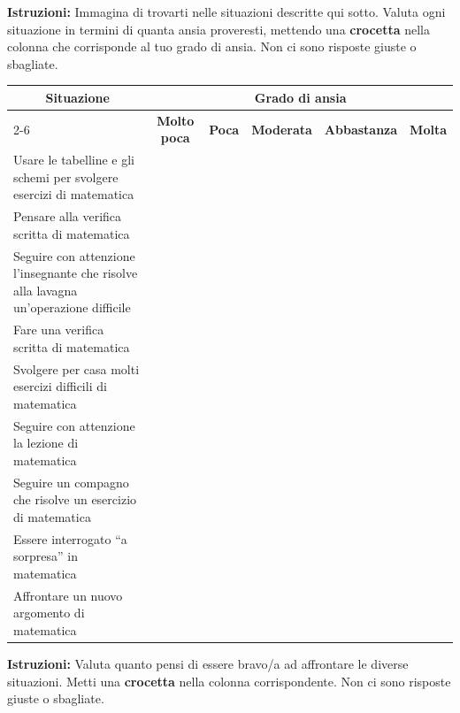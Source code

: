 \documentclass[11pt]{article}
\begin{document}
\vspace{0.3cm}

\noindent\textbf{Istruzioni:} Immagina di trovarti nelle situazioni descritte qui sotto. Valuta ogni situazione in termini di quanta ansia proveresti, mettendo una \textbf{crocetta} nella colonna che corrisponde al tuo grado di ansia. Non ci sono risposte giuste o sbagliate.
\newline
\renewcommand{\arraystretch}{1.4} 
\setlength{\tabcolsep}{3pt} 

\noindent
\begin{tabularx}{\textwidth}{|X|c|c|c|c|c|}
\hline
\multicolumn{1}{|c|}{\textbf{Situazione}} & \multicolumn{5}{c|}{\textbf{Grado di ansia}} \\
\cline{2-6}
\multicolumn{1}{|c|}{} & \textbf{\scriptsize Molto poca} & \textbf{\scriptsize Poca} & \textbf{\scriptsize Moderata} & \textbf{\scriptsize Abbastanza} & \textbf{\scriptsize Molta} \\
\hline
Usare le tabelline e gli schemi per svolgere esercizi di matematica &   &   &   &   &   \\
\hline
Pensare alla verifica scritta di matematica &   &   &   &   &   \\
\hline
Seguire con attenzione l'insegnante che risolve alla lavagna un'operazione difficile &   &   &   &   &   \\
\hline
Fare una verifica scritta di matematica &   &   &   &   &   \\
\hline
Svolgere per casa molti esercizi difficili di matematica &   &   &   &   &   \\
\hline
Seguire con attenzione la lezione di matematica &   &   &   &   &   \\
\hline
Seguire un compagno che risolve un esercizio di matematica &   &   &   &   &   \\
\hline
Essere interrogato “a sorpresa” in matematica &   &   &   &   &   \\
\hline
Affrontare un nuovo argomento di matematica &   &   &   &   &   \\
\hline
\end{tabularx}

\vspace{0.5cm}

\noindent\textbf{Istruzioni:} Valuta quanto pensi di essere bravo/a ad affrontare le diverse situazioni. Metti una \textbf{crocetta} nella colonna corrispondente. Non ci sono risposte giuste o sbagliate.
\newline
\end{document}
